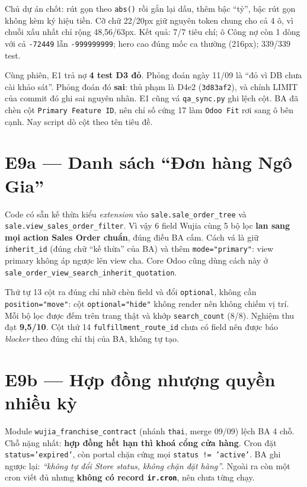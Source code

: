 Chủ dự án chốt: rút gọn theo \texttt{abs()} rồi gắn lại dấu, thêm bậc ``tỷ'', bậc rút gọn không
kèm ký hiệu tiền. Cỡ chữ 22/20px giữ nguyên token chung cho cả 4 ô, vì chuỗi xấu nhất chỉ rộng
48,56/63px. Kết quả: 7/7 tiêu chí; ô Công nợ còn 1 dòng với cả \texttt{-72449} lẫn \texttt{-999999999};
hero cao đúng mốc ca thường (216px); 339/339 test.

Cùng phiên, E1 trả nợ \textbf{4 test D3 đỏ}. Phỏng đoán ngày 11/09 là ``đỏ vì DB chưa cài khảo sát''.
Phỏng đoán đó \textbf{sai}: thủ phạm là D4e2 (\texttt{3d83af2}), và chính LIMIT của commit đó ghi sai
nguyên nhân. E1 cũng vá \texttt{qa\_sync.py} ghi lệch cột. BA đã chèn cột \texttt{Primary Feature ID},
nên chỉ số cứng 17 làm \texttt{Odoo Fit} rơi sang ô bên cạnh. Nay script dò cột theo tên tiêu đề.

\section{E9a --- Danh sách ``Đơn hàng Ngô Gia''}

Code có sẵn kế thừa kiểu \emph{extension} vào \texttt{sale.sale\_order\_tree} và
\texttt{sale.view\_sales\_order\_filter}. Vì vậy 6 field Wujia cùng 5 bộ lọc \textbf{lan sang mọi action
Sales Order chuẩn}, đúng điều BA cấm. Cách vá là giữ \texttt{inherit\_id} (đúng chữ ``kế thừa'' của BA)
và thêm \texttt{mode="primary"}: view primary không áp ngược lên view cha. Core Odoo cũng dùng cách
này ở \texttt{sale\_order\_view\_search\_inherit\_quotation}.

Thứ tự 13 cột ra đúng chỉ nhờ chèn field và đổi \texttt{optional}, không cần \texttt{position="move"}:
cột \texttt{optional="hide"} không render nên không chiếm vị trí. Mỗi bộ lọc được đếm trên trang thật và
khớp \texttt{search\_count} (8/8). Nghiệm thu đạt \textbf{9,5/10}. Cột thứ 14 \texttt{fulfillment\_route\_id}
chưa có field nên được báo \emph{blocker} theo đúng chỉ thị của BA, không tự tạo.

\section{E9b --- Hợp đồng nhượng quyền nhiều kỳ}

Module \texttt{wujia\_franchise\_contract} (nhánh \texttt{thai}, merge 09/09) lệch BA 4 chỗ. Chỗ nặng nhất:
\textbf{hợp đồng hết hạn thì khoá cổng cửa hàng}. Cron đặt \texttt{status='expired'}, còn portal chặn
cứng mọi \texttt{status != 'active'}. BA ghi ngược lại: \emph{``không tự đổi Store status, không chặn đặt
hàng''}. Ngoài ra còn một cron viết đủ nhưng \textbf{không có record \texttt{ir.cron}}, nên chưa từng chạy.

